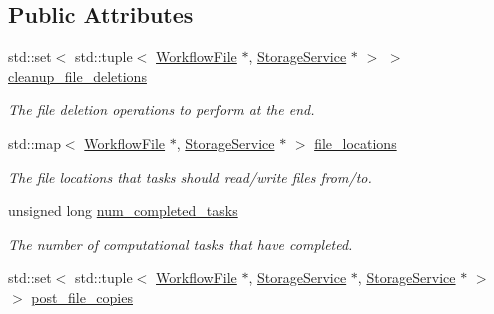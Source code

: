 \subsection*{Public Attributes}
\begin{DoxyCompactItemize}
\item 
\mbox{\label{classwrench_1_1_standard_job_aa71c5567a875923320f87f009998eaf2}} 
std\+::set$<$ std\+::tuple$<$ \hyperlink{classwrench_1_1_workflow_file}{Workflow\+File} $\ast$, \hyperlink{classwrench_1_1_storage_service}{Storage\+Service} $\ast$ $>$ $>$ \hyperlink{classwrench_1_1_standard_job_aa71c5567a875923320f87f009998eaf2}{cleanup\+\_\+file\+\_\+deletions}
\begin{DoxyCompactList}\small\item\em The file deletion operations to perform at the end. \end{DoxyCompactList}\item 
\mbox{\label{classwrench_1_1_standard_job_a682671531386ce9fe048809b74c7b470}} 
std\+::map$<$ \hyperlink{classwrench_1_1_workflow_file}{Workflow\+File} $\ast$, \hyperlink{classwrench_1_1_storage_service}{Storage\+Service} $\ast$ $>$ \hyperlink{classwrench_1_1_standard_job_a682671531386ce9fe048809b74c7b470}{file\+\_\+locations}
\begin{DoxyCompactList}\small\item\em The file locations that tasks should read/write files from/to. \end{DoxyCompactList}\item 
\mbox{\label{classwrench_1_1_standard_job_acbb08d57f0b36a87dcb1d77c89de103b}} 
unsigned long \hyperlink{classwrench_1_1_standard_job_acbb08d57f0b36a87dcb1d77c89de103b}{num\+\_\+completed\+\_\+tasks}
\begin{DoxyCompactList}\small\item\em The number of computational tasks that have completed. \end{DoxyCompactList}\item 
\mbox{\label{classwrench_1_1_standard_job_a3194f2d0255a353f069d058c7d230799}} 
std\+::set$<$ std\+::tuple$<$ \hyperlink{classwrench_1_1_workflow_file}{Workflow\+File} $\ast$, \hyperlink{classwrench_1_1_storage_service}{Storage\+Service} $\ast$, \hyperlink{classwrench_1_1_storage_service}{Storage\+Service} $\ast$ $>$ $>$ \hyperlink{classwrench_1_1_standard_job_a3194f2d0255a353f069d058c7d230799}{post\+\_\+file\+\_\+copies}

\end{DoxyCompactItemize}
